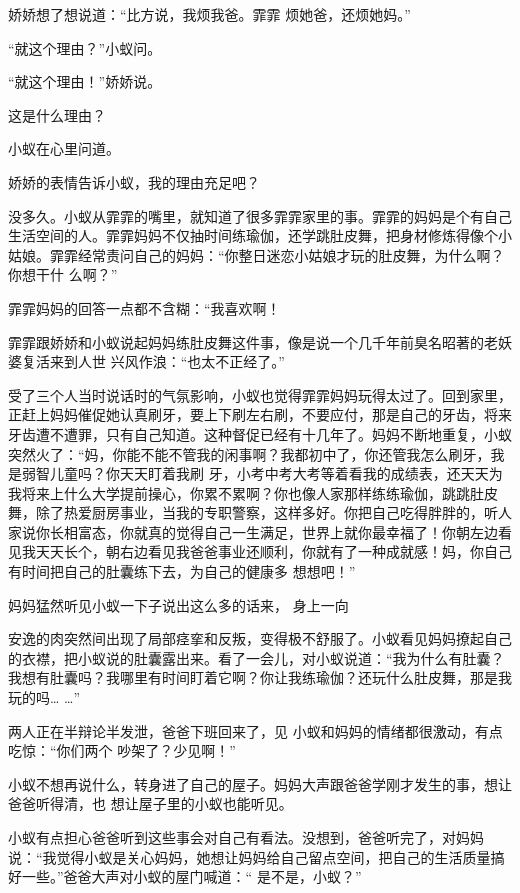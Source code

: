 \documentclass{article}
\begin{document}
娇娇想了想说道：“比方说，我烦我爸。霏霏
烦她爸，还烦她妈。” 


“就这个理由？”小蚁问。 


“就这个理由！”娇娇说。 


这是什么理由？ 


小蚁在心里问道。 


\newpage

娇娇的表情告诉小蚁，我的理由充足吧？ 

没多久。小蚁从霏霏的嘴里，就知道了很多霏霏家里的事。霏霏的妈妈是个有自己生活空间的人。霏霏妈妈不仅抽时间练瑜伽，还学跳肚皮舞，把身材修炼得像个小姑娘。霏霏经常责问自己的妈妈：“你整日迷恋小姑娘才玩的肚皮舞，为什么啊？你想干什
么啊？” 

霏霏妈妈的回答一点都不含糊：“我喜欢啊！

霏霏跟娇娇和小蚁说起妈妈练肚皮舞这件事，像是说一个几千年前臭名昭著的老妖婆复活来到人世
兴风作浪：“也太不正经了。” 

受了三个人当时说话时的气氛影响，小蚁也觉得霏霏妈妈玩得太过了。回到家里，正赶上妈妈催促她认真刷牙，要上下刷左右刷，不要应付，那是自己的牙齿，将来牙齿遭不遭罪，只有自己知道。这种督促已经有十几年了。妈妈不断地重复，小蚁突然火了：“妈，你能不能不管我的闲事啊？我都初中了，你还管我怎么刷牙，我是弱智儿童吗？你天天盯着我刷
\newpage
牙，小考中考大考等着看我的成绩表，还天天为我将来上什么大学提前操心，你累不累啊？你也像人家那样练练瑜伽，跳跳肚皮舞，除了热爱厨房事业，当我的专职警察，这样多好。你把自己吃得胖胖的，听人家说你长相富态，你就真的觉得自己一生满足，世界上就你最幸福了！你朝左边看见我天天长个，朝右边看见我爸爸事业还顺利，你就有了一种成就感！妈，你自己有时间把自己的肚囊练下去，为自己的健康多
想想吧！” 

妈妈猛然听见小蚁一下子说出这么多的话来，
身上一向 

安逸的肉突然间出现了局部痉挛和反叛，变得极不舒服了。小蚁看见妈妈撩起自己的衣襟，把小蚁说的肚囊露出来。看了一会儿，对小蚁说道：“我为什么有肚囊？我想有肚囊吗？我哪里有时间盯着它啊？你让我练瑜伽？还玩什么肚皮舞，那是我玩的吗…
…” 

两人正在半辩论半发泄，爸爸下班回来了，见
\newpage
小蚁和妈妈的情绪都很激动，有点吃惊：“你们两个
吵架了？少见啊！” 

小蚁不想再说什么，转身进了自己的屋子。妈妈大声跟爸爸学刚才发生的事，想让爸爸听得清，也
想让屋子里的小蚁也能听见。 

小蚁有点担心爸爸听到这些事会对自己有看法。没想到，爸爸听完了，对妈妈说：“我觉得小蚁是关心妈妈，她想让妈妈给自己留点空间，把自己的生活质量搞好一些。”爸爸大声对小蚁的屋门喊道：“
是不是，小蚁？” 
\end{document}
